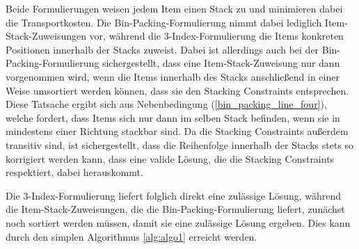 Beide Formulierungen weisen jedem Item einen Stack zu und minimieren dabei die Transportkosten.
Die Bin-Packing-Formulierung nimmt dabei lediglich Item-Stack-Zuweisungen vor, während die 3-Index-Formulierung die
Items konkreten Positionen innerhalb der Stacks zuweist. Dabei ist allerdings auch bei der Bin-Packing-Formulierung
sichergestellt, dass eine Item-Stack-Zuweisung nur dann vorgenommen wird, wenn die Items innerhalb des Stacks anschließend
in einer Weise umsortiert werden können, dass sie den Stacking Constraints entsprechen. Diese Tatsache ergibt sich aus Nebenbedingung (\ref{bin_packing_line_four}), welche fordert, dass Items sich nur dann im selben Stack befinden, wenn sie in mindestens einer Richtung stackbar sind.
Da die Stacking Constraints außerdem transitiv sind, ist sichergestellt, dass die Reihenfolge innerhalb der Stacks stets so korrigiert
werden kann, dass eine valide Lösung, die die Stacking Constraints respektiert, dabei herauskommt.

Die 3-Index-Formulierung liefert folglich direkt eine zulässige Lösung, während die Item-Stack-Zuweisungen, die die Bin-Packing-Formulierung liefert, zunächst noch sortiert werden müssen, damit sie eine zulässige Lösung ergeben. Dies kann durch den simplen Algorithmus \ref{alg:algo1} erreicht werden.










